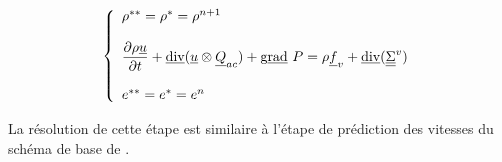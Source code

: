 \begin{equation}\label{Cfbl_Cfqdmv_eq_qdm_cfqdmv}
\left\{\begin{array}{l}

\rho^{**}=\rho^{*}=\rho^{n+1}\\
\\
\displaystyle\frac{\partial \rho\underline{u}}{\partial t}+
\underline{\text{div}}(\underline{u} \otimes \underline{Q}_{ac}) + \text{g}\underline{\text{rad}}\ {P}
= \rho \underline{f}_v + \underline{\text{div}}(\underline{\underline{\Sigma}}^v)\\
\\
e^{**}=e^{*}=e^n\\

\end{array}\right.
\end{equation}

La r\'esolution de cette \'etape est similaire \`a l'\'etape
de pr\'ediction des vitesses du sch\'ema de base de \CS.
